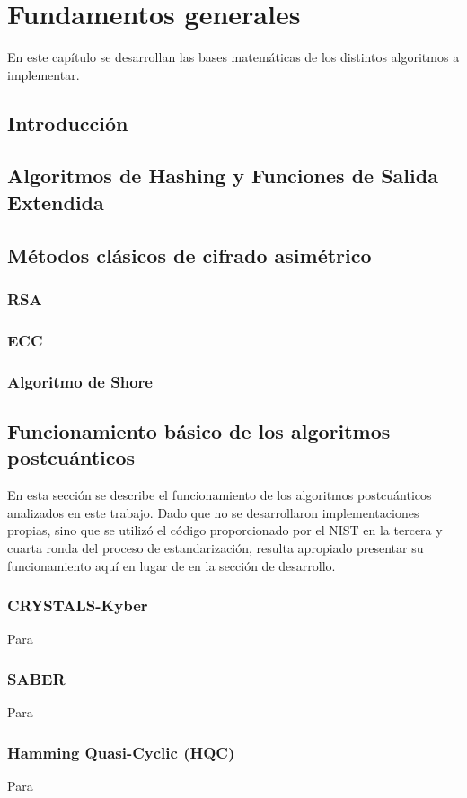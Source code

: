 \chapter{Fundamentos generales}
En este capítulo se desarrollan las bases matemáticas de los distintos algoritmos a implementar.
\section{Introducción}
\section{Algoritmos de Hashing y Funciones de Salida Extendida\cite{FIPS202}}
\section{Métodos clásicos de cifrado asimétrico}
\subsection{RSA}
\subsection{ECC}
\subsection{Algoritmo de Shore}
\newpage
\section{Funcionamiento básico de los algoritmos postcuánticos}
En esta sección se describe el funcionamiento de los algoritmos postcuánticos analizados en este trabajo. Dado que no se desarrollaron implementaciones propias, sino que se utilizó el código proporcionado por el NIST en la tercera \cite{nistPQCround3} y cuarta \cite{nistPQCround4} ronda del proceso de estandarización, resulta apropiado presentar su funcionamiento aquí en lugar de en la sección de desarrollo.
\subsection{CRYSTALS-Kyber }
Para \cite{kyber-spec-2021}
\subsection{SABER}
Para \cite{saber-spec-2020}
\subsection{Hamming Quasi-Cyclic (HQC)}
Para  \cite{hqc-spec-2022}
